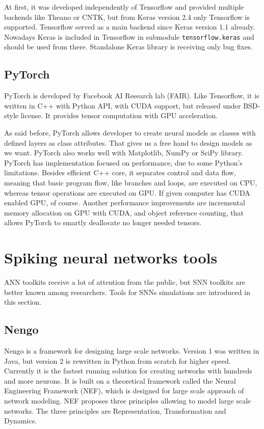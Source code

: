 At first, it was developed independently of Tensorflow and provided multiple backends like Theano or CNTK, but from Keras version 2.4 only Tensorflow is supported. Tensorflow served as a main backend since Keras version 1.1 already. Nowadays Keras is included in Tensorflow in submodule \texttt{tensorflow.keras} and should be used from there. Standalone Keras library is receiving only bug fixes. \cite{keras}


\subsection{PyTorch}%
\label{sub:pytorch}

PyTorch is developed by Facebook AI Research lab (FAIR). Like Tensorflow, it is written in C++ with Python API, with CUDA support, but released under BSD-style license. It provides tensor computation with GPU acceleration. \cite{pytorch}

As said before, PyTorch allows developer to create neural models as classes with defined layers as class attributes. That gives us a free hand to design models as we want. PyTorch also works well with Matplotlib, NumPy or SciPy library. PyTorch has implementation focused on performance, due to some Python's limitations. Besides efficient C++ core, it separates control and data flow, meaning that basic program flow, like branches and loops, are executed on CPU, whereas tensor operations are executed on GPU. If given computer has CUDA enabled GPU, of course. Another performance improvements are incremental memory allocation on GPU with CUDA, and object reference counting, that allows PyTorch to smartly deallocate no longer needed tensors. \cite{pytorch-paper}

%
%

\section{Spiking neural networks tools}%
\label{sec:spiking_neural_networks_tools}

ANN toolkits receive a lot of attention from the public, but SNN toolkits are better known among researchers. Tools for SNNs simulations are introduced in this section.


\subsection{Nengo}%
\label{sub:nengo}

Nengo is a framework for designing large scale networks. Version 1 was written in Java, but version 2 is rewritten in Python from scratch for higher speed. Currently it is the fastest running solution for creating networks with hundreds and more neurons. \cite{nengo} It is built on a theoretical framework called the Neural Engineering Framework (NEF), which is designed for large scale approach of network modeling. NEF proposes three principles allowing to model large scale networks. The three principles are Representation, Transformation and Dynamics.

